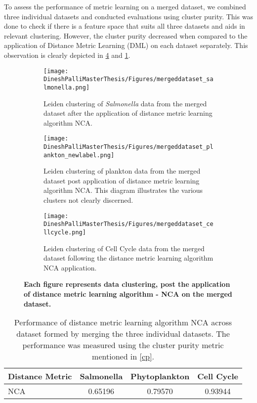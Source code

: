 \documentclass[12pt,a4paper]{article}
\begin{document}
To assess the performance of metric learning on a merged dataset, we combined three individual datasets and conducted evaluations using cluster purity. This was done to check if there is a feature space that suits all three datasets and aids in relevant clustering. However, the cluster purity decreased when compared to the application of Distance Metric Learning (DML) on each dataset separately. This observation is clearly depicted in \ref{multifig5:mergeddataset_clusters} and \ref{tab:DMLonmergeddataset}.


\begin{figure}
  \centering
  \begin{subfigure}{\linewidth}
    \texttt{[image: DineshPalliMasterThesis/Figures/mergeddataset\_salmonella.png]}
    \caption{Leiden clustering of \textit{Salmonella} data from the merged dataset after the application of distance metric learning algorithm NCA.}
    \label{multifig5:image_a}
  \end{subfigure}
  \hfill
  \begin{subfigure}{\linewidth}
    \texttt{[image: DineshPalliMasterThesis/Figures/mergeddataset\_plankton\_newlabel.png]}
    \caption{Leiden clustering of plankton data from the merged dataset post application of distance metric learning algorithm NCA. This diagram illustrates the various clusters not clearly discerned.}
    \label{multifig5:image_b}
  \end{subfigure}
  \hfill
  \begin{subfigure}{\linewidth}
    \texttt{[image: DineshPalliMasterThesis/Figures/mergeddataset\_cellcycle.png]}
    \caption{Leiden clustering of Cell Cycle data from the merged dataset following the distance metric learning algorithm NCA application.}
    \label{multifig5:image_c}
  \end{subfigure}
  \caption[Clustering on merged dataset]{\textbf{Each figure represents data clustering, post the application of distance metric learning algorithm - NCA on the merged dataset.}}
  \label{multifig5:mergeddataset_clusters}
\end{figure}


\begin{table}[h]
\small
\centering
\caption{Performance of distance metric learning algorithm NCA across dataset formed by merging the three individual datasets. The performance was measured using the cluster purity metric mentioned in \ref{cp}.}
\label{tab:DMLonmergeddataset}
\begin{tabular}{lccc}
\hline
\textbf{Distance Metric} & \textbf{Salmonella} & \textbf{Phytoplankton} & \textbf{Cell Cycle} \\
\hline
NCA & 0.65196 & 0.79570 & 0.93944 \\
\hline
\end{tabular}
\end{table}
\end{document}
